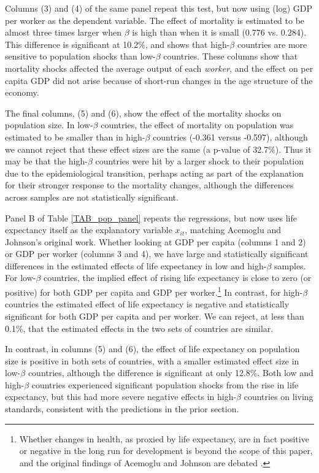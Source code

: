 \documentclass[11pt]{article}
\begin{document}
Columns (3) and (4) of the same panel repeat this test, but now using (log) GDP per worker as the dependent variable. The effect of mortality is estimated to be almost three times larger when $\beta$ is high than when it is small (0.776 vs. 0.284). This difference is significant at 10.2\%, and shows that high-$\beta$ countries are more sensitive to population shocks than low-$\beta$ countries. These columns show that mortality shocks affected the average output of each \textit{worker}, and the effect on per capita GDP did not arise because of short-run changes in the age structure of the economy.

The final columns, (5) and (6), show the effect of the mortality shocks on population size. In low-$\beta$ countries, the effect of mortality on population was estimated to be smaller than in high-$\beta$ countries (-0.361 versus -0.597), although we cannot reject that these effect sizes are the same (a p-value of 32.7\%). Thus it may be that the high-$\beta$ countries were hit by a larger shock to their population due to the epidemiological transition, perhaps acting as part of the explanation for their stronger response to the mortality changes, although the differences across samples are not statistically significant.

Panel B of Table \ref{TAB_pop_panel} repeats the regressions, but now uses life expectancy itself as the explanatory variable $x_{it}$, matching Acemoglu and Johnson's original work. Whether looking at GDP per capita (columns 1 and 2) or GDP per worker (columns 3 and 4), we have large and statistically significant differences in the estimated effects of life expectancy in low and high-$\beta$ samples. For low-$\beta$ countries, the implied effect of rising life expectancy is close to zero (or positive) for both GDP per capita and GDP per worker.\footnote{Whether changes in health, as proxied by life expectancy, are in fact positive or negative in the long run for development is beyond the scope of this paper, and the original findings of Acemoglu and Johnson are debated \citep{bcf2014}.} In contrast, for high-$\beta$ countries the estimated effect of life expectancy is negative and statistically significant for both GDP per capita and per worker. We can reject, at less than 0.1\%, that the estimated effects in the two sets of countries are similar. 

In contrast, in columns (5) and (6), the effect of life expectancy on population size is positive in both sets of countries, with a smaller estimated effect size in low-$\beta$ countries, although the difference is significant at only 12.8\%. Both low and high-$\beta$ countries experienced significant population shocks from the rise in life expectancy, but this had more severe negative effects in high-$\beta$ countries on living standards, consistent with the predictions in the prior section.
\end{document}
